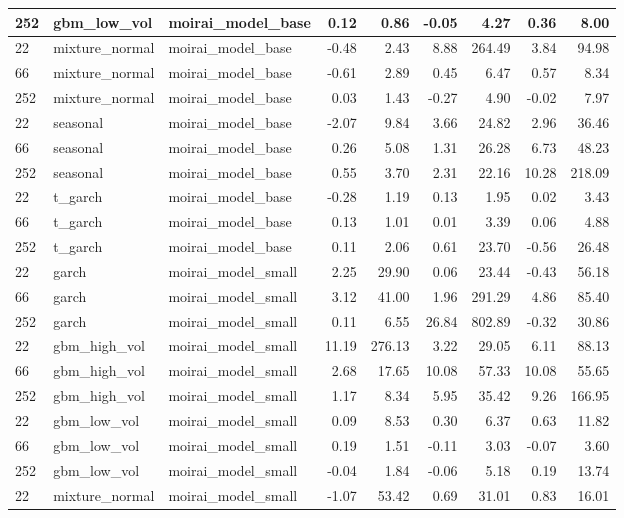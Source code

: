 {\begin{tabular}{lllrrrrrr}
252 & gbm\_low\_vol & moirai\_model\_base & 0.12 & 0.86 & -0.05 & 4.27 & 0.36 & 8.00 \\
\midrule
22 & mixture\_normal & moirai\_model\_base & -0.48 & 2.43 & 8.88 & 264.49 & 3.84 & 94.98 \\
66 & mixture\_normal & moirai\_model\_base & -0.61 & 2.89 & 0.45 & 6.47 & 0.57 & 8.34 \\
252 & mixture\_normal & moirai\_model\_base & 0.03 & 1.43 & -0.27 & 4.90 & -0.02 & 7.97 \\
\midrule
22 & seasonal & moirai\_model\_base & -2.07 & 9.84 & 3.66 & 24.82 & 2.96 & 36.46 \\
66 & seasonal & moirai\_model\_base & 0.26 & 5.08 & 1.31 & 26.28 & 6.73 & 48.23 \\
252 & seasonal & moirai\_model\_base & 0.55 & 3.70 & 2.31 & 22.16 & 10.28 & 218.09 \\
\midrule
22 & t\_garch & moirai\_model\_base & -0.28 & 1.19 & 0.13 & 1.95 & 0.02 & 3.43 \\
66 & t\_garch & moirai\_model\_base & 0.13 & 1.01 & 0.01 & 3.39 & 0.06 & 4.88 \\
252 & t\_garch & moirai\_model\_base & 0.11 & 2.06 & 0.61 & 23.70 & -0.56 & 26.48 \\
\midrule
22 & garch & moirai\_model\_small & 2.25 & 29.90 & 0.06 & 23.44 & -0.43 & 56.18 \\
66 & garch & moirai\_model\_small & 3.12 & 41.00 & 1.96 & 291.29 & 4.86 & 85.40 \\
252 & garch & moirai\_model\_small & 0.11 & 6.55 & 26.84 & 802.89 & -0.32 & 30.86 \\
\midrule
22 & gbm\_high\_vol & moirai\_model\_small & 11.19 & 276.13 & 3.22 & 29.05 & 6.11 & 88.13 \\
66 & gbm\_high\_vol & moirai\_model\_small & 2.68 & 17.65 & 10.08 & 57.33 & 10.08 & 55.65 \\
252 & gbm\_high\_vol & moirai\_model\_small & 1.17 & 8.34 & 5.95 & 35.42 & 9.26 & 166.95 \\
\midrule
22 & gbm\_low\_vol & moirai\_model\_small & 0.09 & 8.53 & 0.30 & 6.37 & 0.63 & 11.82 \\
66 & gbm\_low\_vol & moirai\_model\_small & 0.19 & 1.51 & -0.11 & 3.03 & -0.07 & 3.60 \\
252 & gbm\_low\_vol & moirai\_model\_small & -0.04 & 1.84 & -0.06 & 5.18 & 0.19 & 13.74 \\
\midrule
22 & mixture\_normal & moirai\_model\_small & -1.07 & 53.42 & 0.69 & 31.01 & 0.83 & 16.01 \\

\end{tabular}}
